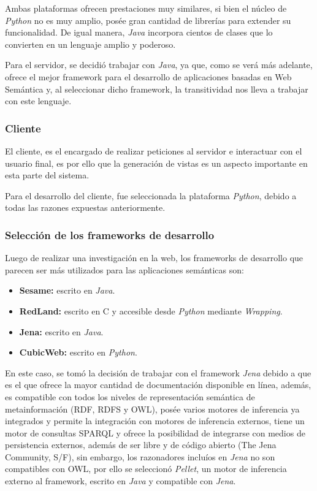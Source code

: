 Ambas plataformas ofrecen prestaciones muy similares, si bien el núcleo de \textit{Python} no es muy amplio, posée gran cantidad de librerías para extender su funcionalidad. De igual manera, \textit{Java} incorpora cientos de clases que lo convierten en un lenguaje amplio y poderoso.

Para el servidor, se decidió trabajar con \textit{Java}, ya que, como se verá más adelante, ofrece el mejor framework para el desarrollo de aplicaciones basadas en Web Semántica y, al seleccionar dicho framework, la transitividad nos lleva a trabajar con este lenguaje.

\subsubsection{Cliente}
El cliente, es el encargado de realizar peticiones al servidor e interactuar con el usuario final, es por ello que la generación de vistas es un aspecto importante en esta parte del sistema.

Para el desarrollo del cliente, fue seleccionada la plataforma \textit{Python}, debido a todas las razones expuestas anteriormente.

\subsubsection{Selección de los frameworks de desarrollo}
Luego de realizar una investigación en la web, los frameworks de desarrollo que parecen ser más utilizados para las aplicaciones semánticas son:

\begin{itemize}
    \item \textbf{Sesame:} escrito en \textit{Java}.
    \item \textbf{RedLand:} escrito en C y accesible desde \textit{Python} mediante \textit{Wrapping}.
    \item \textbf{Jena:} escrito en \textit{Java}.
    \item \textbf{CubicWeb:} escrito en \textit{Python}.
\end{itemize}

En este caso, se tomó la decisión de trabajar con el framework \textit{Jena} debido a que es el que ofrece la mayor cantidad de documentación disponible en línea, además, es compatible con todos los niveles de representación semántica de metainformación (RDF, RDFS y OWL), posée varios motores de inferencia ya integrados y permite la integración con motores de inferencia externos, tiene un motor de consultas SPARQL y ofrece la posibilidad de integrarse con medios de persistencia externos, además de ser libre y de código abierto (The Jena Community, S/F), sin embargo, los razonadores incluíos en \textit{Jena} no son compatibles con OWL, por ello se seleccionó \textit{Pellet}, un motor de inferencia externo al framework, escrito en \textit{Java} y compatible con \textit{Jena}.


